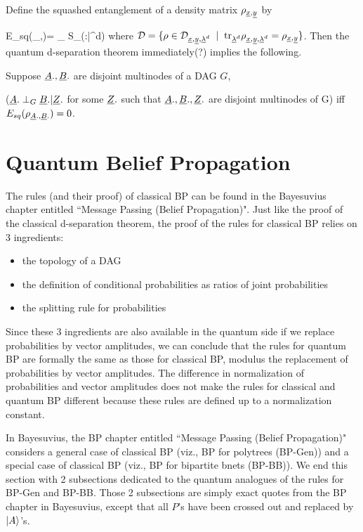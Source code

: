 \documentclass[12pt]{article}
\begin{document}
Define the squashed
entanglement
of a density
matrix $\rho_{{\underline{x}}, {\underline{y}}}$ by

\beq
E_{sq}(\rho_{\rvx,\rvy})=
\min_{\rho\in \cald}
S_\rho(\rvx:\rvy|\rvlam^d)
\eeq
where
${\cal D}=\{\rho
\in
{\cal D}_{{\underline{x}}, {\underline{y}}, {\underline{\lambda}}^d}\;\;|\;\;
{\rm tr }_{{\underline{\lambda}}^d}
\rho_{{\underline{x}},{\underline{y}}, {\underline{\lambda}}^d}
=
\rho_{{\underline{x}}, {\underline{y}}}
\}$.
Then the quantum 
d-separation
theorem immediately(?) implies
the following.

\begin{claim}
Suppose
${\underline{A}}., {\underline{B}}.$
are disjoint multinodes
of a DAG  $G$,
 
(${\underline{A}}.\perp_G {\underline{B}}.|{\underline{Z}}.$ 
for some ${\underline{Z}}.$ such that
${\underline{A}}., {\underline{B}}., {\underline{Z}}.$
are disjoint multinodes of G)
iff
$E_{sq}(\rho_{{\underline{A}}., {\underline{B}}.})=0$.
\end{claim}


\section{Quantum Belief Propagation}

The rules
(and their proof)
of classical BP
can be found
in the Bayesuvius chapter
entitled ``Message
Passing (Belief Propagation)".
Just like
the proof
of the classical 
d-separation
theorem, 
the
proof
of the rules for classical BP
 relies on 3
ingredients:
\begin{itemize}
\item the topology
of a
DAG
\item
the definition
of conditional
probabilities 
as ratios of 
joint
probabilities
\item
the splitting rule
for probabilities
\end{itemize}
Since these
3 ingredients
are also
available
in the quantum
side
if we replace
probabilities
by vector amplitudes,
we can
conclude that
the rules
for quantum
BP
are formally 
the same as those
for classical BP,
modulus the
replacement of
probabilities
by
vector amplitudes.
The
difference in
normalization
of probabilities
and 
vector amplitudes
does not
make
the 
rules
for classical
and quantum
BP
different
because
these
rules
are defined up
to a normalization
constant.

In Bayesuvius, 
the BP chapter entitled ``Message Passing (Belief Propagation)"
considers a general case of classical BP (viz., BP for
polytrees (BP-Gen)) and a special case of classical
BP (viz., BP for bipartite bnets (BP-BB)).
We end this section
with 2 subsections dedicated
to the quantum
analogues of the rules
for BP-Gen and BP-BB.
Those 2 subsections
are simply exact quotes
from the BP chapter in
Bayesuvius,
except that
all $P$'s have been
crossed out and replaced by $|A\rangle$'s.
\end{document}
